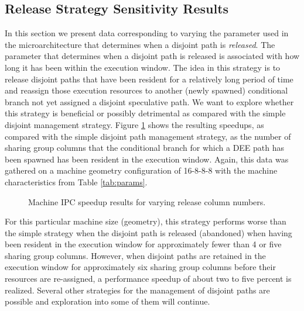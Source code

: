 \documentclass[10pt,dvips]{article}
\begin{document}
\subsection{Release Strategy Sensitivity Results}
%
In this section we present data corresponding to varying the
parameter used in the microarchitecture that determines when
a disjoint path is \textit{released}.
The parameter that determines when a disjoint path is
released is associated with how long it has been within
the execution window.  
The idea in this strategy is to release disjoint paths
that have been resident for a relatively long period of time
and reassign those execution resources to another (newly spawned)
conditional branch not yet assigned a disjoint speculative path.
We want to explore whether this strategy
is beneficial or possibly detrimental as compared with the
simple disjoint management strategy.
Figure \ref{fig:release} shows the resulting speedups,
as compared with the simple disjoint path management strategy,
as the number of sharing group columns that the conditional
branch for which a DEE path has been spawned has been resident in
the execution window.
Again, this data was gathered on a machine geometry configuration
of 16-8-8-8 with the machine characteristics from
Table \ref{tab:params}.
%
\begin{figure}
\centering
{}
\caption{Machine IPC speedup results for varying 
release column numbers.}
\label{fig:release}
\end{figure}
%
For this particular machine size (geometry), this strategy
performs worse than the simple strategy when the disjoint
path is released (abandoned) when having been resident in the 
execution window for approximately fewer than 4 or five sharing
group columns.  However, when disjoint paths are retained in the
execution window for approximately
six sharing group columns before their resources are re-assigned,
a performance speedup of about two to five percent is realized.
Several other strategies for the management of disjoint paths
are possible and exploration into some of them will continue.
%
\end{document}
